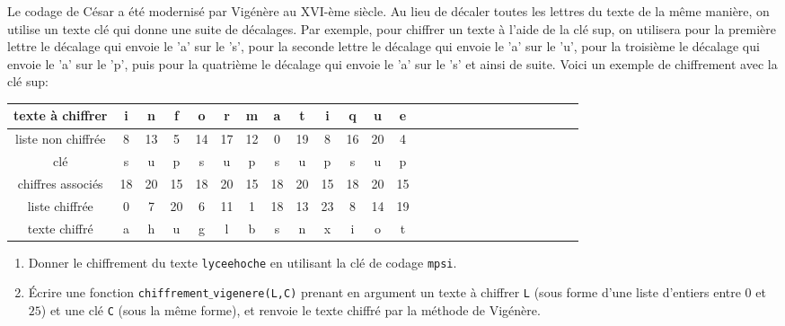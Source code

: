 Le codage de César a été modernisé par Vigénère au XVI-ème siècle. Au lieu de décaler toutes les lettres du texte de la même manière, on utilise un texte clé qui donne une suite de décalages.\newline
Par exemple, pour chiffrer un texte à l'aide de la clé \og sup\fg, on utilisera pour la première lettre le décalage qui envoie le 'a' sur le 's', pour la seconde lettre le décalage qui envoie le 'a' sur le 'u', pour la troisième le décalage qui envoie le 'a' sur le 'p', puis pour la quatrième le décalage qui envoie le 'a' sur le 's' et ainsi de suite.\newline
Voici un exemple de chiffrement avec la clé \og sup\fg :
\begin{center}
\renewcommand{\arraystretch}{1.2}
\begin{tabular}{|c|c|c|c|c|c|c|c|c|c|c|c|c|c|c|c|c|c|c|c|c|c|c|c|c|c|}
\hline
texte à chiffrer & i & n & f & o & r & m & a & t & i & q & u & e\\
\hline
liste non chiffrée & 8 & 13 & 5 & 14 & 17 & 12 & 0 & 19 & 8 & 16 & 20 & 4\\
\hline 
clé & s & u & p & s & u & p & s & u & p & s & u & p \\
\hline
chiffres associés & 18 & 20 & 15 & 18 & 20 & 15 & 18 & 20 & 15 & 18 & 20 & 15 \\
\hline
liste chiffrée & 0 & 7 & 20 & 6 & 11 & 1 & 18 & 13 & 23 & 8 & 14 & 19\\
\hline
texte chiffré & a& h & u & g & l & b & s & n & x & i & o & t \\
\hline
\end{tabular}
\end{center}
\begin{enumerate}
  \item Donner le chiffrement du texte \texttt{lyceehoche} en utilisant la clé de codage \texttt{mpsi}.

  \item \'Ecrire une fonction \texttt{chiffrement$\_$vigenere(L,C)} prenant en argument un texte à chiffrer \texttt{L} (sous forme d'une liste d'entiers entre $0$ et $25$) et une clé \texttt{C} (sous la même forme), et renvoie le texte chiffré par la méthode de Vigénère.

\end{enumerate}
%


